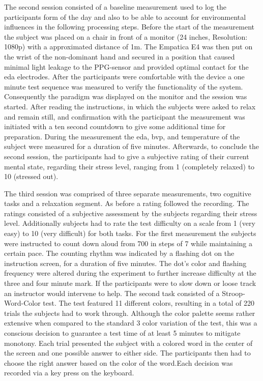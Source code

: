 The second session consisted of a baseline measurement used to log the participants form of the day and also to be able to account for environmental influences in the following processing steps. Before the start of the measurement the subject was placed on a chair in front of a monitor (24 inches, Resolution: 1080p) with a approximated distance of 1m. The Empatica E4 was then put on the wrist of the non-dominant hand and secured in a position that caused minimal light leakage to the PPG-sensor and provided optimal contact for the \gls{eda} electrodes. After the participants were comfortable with the device a one minute test sequence was measured to verify the functionality of the system.
Consequently the paradigm was displayed on the monitor and the session was started. After reading the instructions, in which the subjects were asked to relax and remain still, and confirmation with the participant the measurement was initiated with a ten second countdown to give some additional time for preparation.
During the measurement the \gls{eda}, \gls{bvp}, and temperature of the subject were measured for a duration of five minutes.
Afterwards, to conclude the second session, the participants had to give a subjective rating of their current mental state, regarding their stress level, ranging from 1 (completely relaxed) to 10 (stressed out).

The third session was comprised of three separate measurements, two cognitive tasks and a relaxation segment. As before a rating followed the recording. The ratings consisted of a subjective assessment by the subjects regarding their stress level. Additionally subjects had to rate the test difficulty on a scale from 1 (very easy) to 10 (very difficult) for both tasks. 
For the first measurement the subjects were instructed to count down aloud from 700 in steps of 7 while maintaining a certain pace. The counting rhythm was indicated by a flashing dot on the instruction screen, for a duration of five minutes. The dot's color and flashing frequency were altered during the experiment to further increase difficulty at the three and four minute mark. If the participants were to slow down or loose track an instructor would intervene to help.
The second task consisted of a Stroop-Word-Color test. The test featured 11 different colors, resulting in a total of 220 trials the subjects had to work through. Although the color palette seems rather extensive when compared to the standard 3 color variation of the test, this was a conscious decision to guarantee a test time of at least 5 minutes to mitigate monotony. Each trial presented the subject with a colored word in the center of the screen and one possible answer to either side. The participants then had to choose the right answer based on the color of the word.Each decision was recorded via a key press on the keyboard. 

